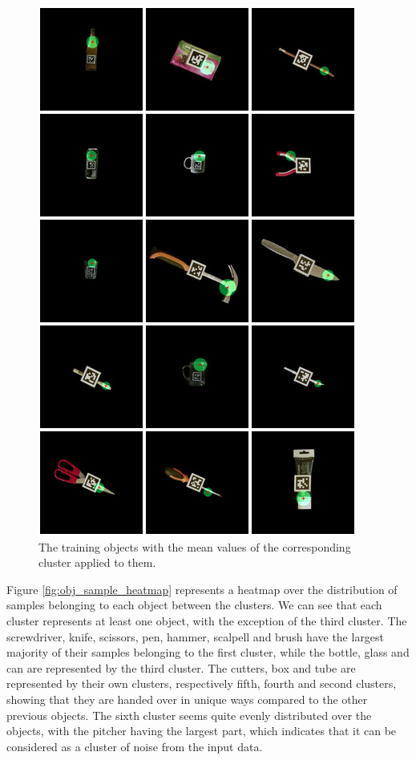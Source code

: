 \begin{figure}
	\centering
	\includegraphics[width=\textwidth]{img/results/objects.jpg}
	\caption{The training objects with the mean values of the corresponding cluster applied to them.}
	\label{fig:results_objects}
\end{figure}

Figure \ref{fig:obj_sample_heatmap} represents a heatmap over the distribution of samples belonging to each object between the clusters. We can see that each cluster represents at least one object, with the exception of the third cluster. The screwdriver, knife, scissors, pen, hammer, scalpell and brush have the largest majority of their samples belonging to the first cluster, while the bottle, glass and can are represented by the third cluster. The cutters, box and tube are represented by their own clusters, respectively fifth, fourth and second clusters, showing that they are handed over in unique ways compared to the other previous objects. The sixth cluster seems quite evenly distributed over the objects, with the pitcher having the largest part, which indicates that it can be considered as a cluster of noise from the input data.

